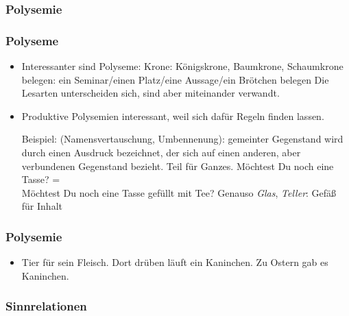 \subsubsection{Polysemie}

\begin{frame}
\frametitle{Polyseme}
  \begin{itemize}
  \item Interessanter sind Polyseme:
\eal
\ex Krone: Königskrone, Baumkrone, Schaumkrone
\ex belegen: ein Seminar/einen Platz/eine Aussage/ein Brötchen belegen
\zl
Die Lesarten unterscheiden sich, sind aber miteinander verwandt.

\pause
\item Produktive Polysemien interessant, weil sich dafür Regeln finden lassen.

%
Beispiel:  (Namensvertauschung, Umbennenung): gemeinter Gegenstand wird durch einen Ausdruck bezeichnet, der sich
auf einen anderen, aber verbundenen Gegenstand bezieht. \zb Teil für Ganzes.
\ea
Möchtest Du noch eine Tasse? = \\Möchtest Du noch eine Tasse gefüllt mit Tee?
\z
Genauso \emph{Glas}, \emph{Teller}: Gefäß für Inhalt

  \end{itemize}
\end{frame}

\begin{frame}
\frametitle{Polysemie}
  \begin{itemize}
  \item Tier für sein Fleisch.
\eal
\ex Dort drüben läuft ein Kaninchen. 
\ex Zu Ostern gab es Kaninchen.
\zl
  \end{itemize}
\end{frame}




%
\subsubsection{Sinnrelationen}
%

